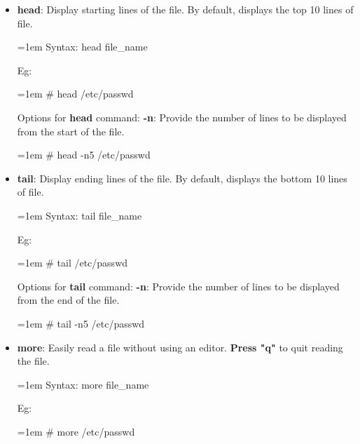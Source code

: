 \begin{flushleft}
\begin{itemize}
		\newpage
				
		\item \textbf{head}: Display starting lines of the file. By default, displays the top 10 lines of file.
		\bigskip
		\begin{tcolorbox}[breakable,notitle,boxrule=-0pt,colback=pink,colframe=pink]
			\color{black}
			\font=1em
			Syntax: head file\_name
			\font=4pt
		\end{tcolorbox}
		Eg:
		\bigskip
		\begin{tcolorbox}[breakable,notitle,boxrule=-0pt,colback=black,colframe=black]
			\color{green}
			\font=1em
			\# head /etc/passwd
			\font=4pt
		\end{tcolorbox}		
		Options for \textbf{head} command:
		\newline
		\textbf{-n}: Provide the number of lines to be displayed from the start of the file.
		\bigskip
		\begin{tcolorbox}[breakable,notitle,boxrule=-0pt,colback=black,colframe=black]
			\color{green}
			\font=1em
			\# head -n5 /etc/passwd
			\font=4pt
		\end{tcolorbox}		

		\bigskip
		\bigskip
		\item \textbf{tail}: Display ending lines of the file. By default, displays the bottom 10 lines of file.
		\bigskip
		\begin{tcolorbox}[breakable,notitle,boxrule=-0pt,colback=pink,colframe=pink]
			\color{black}
			\font=1em
			Syntax: tail file\_name
			\font=4pt
		\end{tcolorbox}
		Eg:
		\bigskip
		\begin{tcolorbox}[breakable,notitle,boxrule=-0pt,colback=black,colframe=black]
			\color{green}
			\font=1em
			\# tail /etc/passwd
			\font=4pt
		\end{tcolorbox}		
		Options for \textbf{tail} command:
		\newline
		\textbf{-n}: Provide the number of lines to be displayed from the end of the file.
		\bigskip
		\begin{tcolorbox}[breakable,notitle,boxrule=-0pt,colback=black,colframe=black]
			\color{green}
			\font=1em
			\# tail -n5 /etc/passwd
			\font=4pt
		\end{tcolorbox}		
		
		\bigskip
		\bigskip

		\item \textbf{more}: Easily read a file without using an editor. \textbf{Press "q"} to quit reading the file.
		\bigskip
		\begin{tcolorbox}[breakable,notitle,boxrule=-0pt,colback=pink,colframe=pink]
			\color{black}
			\font=1em
			Syntax: more file\_name
			\font=4pt
		\end{tcolorbox}
		Eg:
		\bigskip
		\begin{tcolorbox}[breakable,notitle,boxrule=-0pt,colback=black,colframe=black]
			\color{green}
			\font=1em
			\# more /etc/passwd
			\font=4pt
		\end{tcolorbox}		



\end{itemize}
\end{flushleft}
